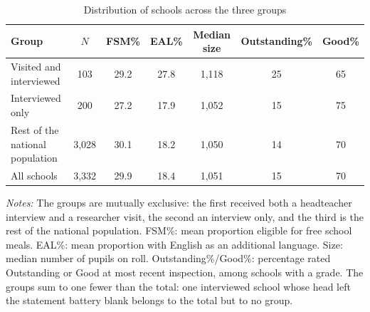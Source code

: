 \begin{table}[htbp]
\centering
\caption{Distribution of schools across the three groups}
\label{tab:tier_summary}
\small
\begin{tabular}{lcccccc}
\toprule
Group & $N$ & FSM\% & EAL\% & Median size & Outstanding\% & Good\% \\
\midrule
Visited and interviewed & 103 & 29.2 & 27.8 & 1{,}118 & 25 & 65 \\
Interviewed only & 200 & 27.2 & 17.9 & 1{,}052 & 15 & 75 \\
Rest of the national population & 3{,}028 & 30.1 & 18.2 & 1{,}050 & 14 & 70 \\
\midrule
All schools & 3{,}332 & 29.9 & 18.4 & 1{,}051 & 15 & 70 \\
\bottomrule
\end{tabular}
\smallskip
\begin{minipage}{0.92\linewidth}
\footnotesize\textit{Notes:} The groups are mutually exclusive: the first received both a headteacher interview and a researcher visit, the second an interview only, and the third is the rest of the national population. FSM\%: mean proportion eligible for free school meals. EAL\%: mean proportion with English as an additional language. Size: median number of pupils on roll. Outstanding\%/Good\%: percentage rated Outstanding or Good at most recent inspection, among schools with a grade. The groups sum to one fewer than the total: one interviewed school whose head left the statement battery blank belongs to the total but to no group.
\end{minipage}
\end{table}
